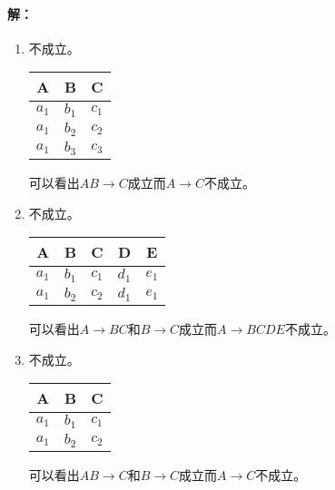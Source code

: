\paragraph{解：}
\begin{enumerate}
	\item 不成立。
	\begin{table}[H]
		\centering
		\begin{tabular}{|c|c|c|}
			\hline
			A & B & C \\\hline
			$a_{1}$ & $b_{1}$ & $c_{1}$ \\
			$a_{1}$ & $b_{2}$ & $c_{2}$ \\
			$a_{1}$ & $b_{3}$ & $c_{3}$ \\\hline
		\end{tabular}
	\end{table}
	可以看出$AB \to C$成立而$A \to C$不成立。
	
	\item 不成立。
	\begin{table}[H]
		\centering
		\begin{tabular}{|c|c|c|c|c|}
			\hline
			A & B & C & D & E \\\hline
			$a_{1}$ & $b_{1}$ & $c_{1}$ & $d_{1}$ & $e_{1}$ \\
			$a_{1}$ & $b_{2}$ & $c_{2}$ & $d_{1}$ & $e_{1}$ \\\hline
		\end{tabular}
	\end{table}
	可以看出$A \to BC$和$B \to C$成立而$A \to BCDE$不成立。
	
	\item 不成立。
	\begin{table}[H]
		\centering
		\begin{tabular}{|c|c|c|}
			\hline
			A & B & C \\\hline
			$a_{1}$ & $b_{1}$ & $c_{1}$ \\
			$a_{1}$ & $b_{2}$ & $c_{2}$ \\\hline
		\end{tabular}
	\end{table}
	可以看出$AB \to C$和$B \to C$成立而$A \to C$不成立。
\end{enumerate}